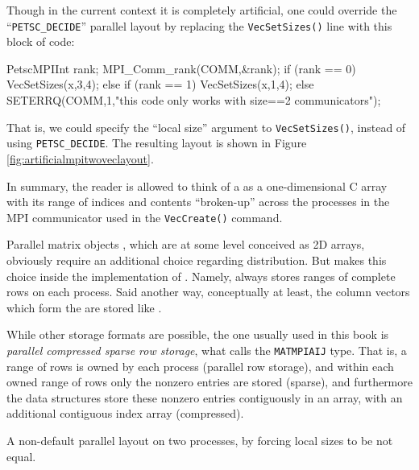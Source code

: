 Though in the current context it is completely artificial, one could override the ``\texttt{PETSC\_DECIDE}'' parallel layout by replacing the \texttt{VecSetSizes()} line with this block of code:
\begin{code}
PetscMPIInt rank;
MPI_Comm_rank(COMM,&rank);
if (rank == 0) {
  VecSetSizes(x,3,4);
} else if (rank == 1) {
  VecSetSizes(x,1,4);
} else {
  SETERRQ(COMM,1,"this code only works with size==2 communicators");
}
\end{code}
That is, we could specify the ``local size'' argument to \texttt{VecSetSizes()}, instead of using \texttt{PETSC\_DECIDE}.  The resulting layout is shown in Figure \ref{fig:artificialmpitwoveclayout}.

In summary, the reader is allowed to think of a \PETSc \pVec as a one-dimensional C array with its range of indices and contents ``broken-up'' across the processes in the MPI communicator used in the \texttt{VecCreate()} command.

Parallel matrix objects \pMat, which are at some level conceived as 2D arrays, obviously require an additional choice regarding distribution.  But \PETSc makes this choice inside the implementation of \pMat.  Namely, \PETSc always stores ranges of complete rows on each process.  Said another way, conceptually at least, the column vectors which form the \pMat are stored like \pVecs.

While other storage formats are possible, the one usually used in this book is \emph{parallel compressed sparse row storage}, what \PETSc calls the \texttt{MATMPIAIJ} type.  That is, a range of rows is owned by each process (parallel row storage), and within each owned range of rows only the nonzero entries are stored (sparse), and furthermore the data structures store these nonzero entries contiguously in an array, with an additional contiguous index array (compressed).

\begin{marginfigure}
\bigskip
\caption{A non-default parallel \pVec layout on two processes, by forcing local sizes to be not equal.}
\label{fig:artificialmpitwoveclayout}
\end{marginfigure}

